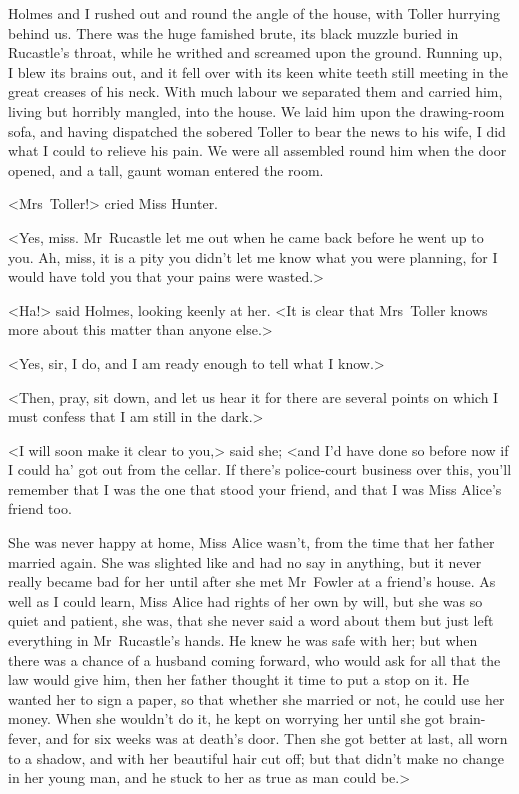 Holmes and I rushed out and round the angle of the house, with Toller hurrying behind us. There was the huge famished brute, its black muzzle buried in Rucastle's throat, while he writhed and screamed upon the ground. Running up, I blew its brains out, and it fell over with its keen white teeth still meeting in the great creases of his neck. With much labour we separated them and carried him, living but horribly mangled, into the house. We laid him upon the drawing-room sofa, and having dispatched the sobered Toller to bear the news to his wife, I did what I could to relieve his pain. We were all assembled round him when the door opened, and a tall, gaunt woman entered the room.

<Mrs~Toller!> cried Miss Hunter.

<Yes, miss. Mr~Rucastle let me out when he came back before he went up to you. Ah, miss, it is a pity you didn't let me know what you were planning, for I would have told you that your pains were wasted.>

<Ha!> said Holmes, looking keenly at her. <It is clear that Mrs~Toller knows more about this matter than anyone else.>

<Yes, sir, I do, and I am ready enough to tell what I know.>

<Then, pray, sit down, and let us hear it for there are several points on which I must confess that I am still in the dark.>

<I will soon make it clear to you,> said she; <and I'd have done so before now if I could ha' got out from the cellar. If there's police-court business over this, you'll remember that I was the one that stood your friend, and that I was Miss Alice's friend too.

She was never happy at home, Miss Alice wasn't, from the time that her father married again. She was slighted like and had no say in anything, but it never really became bad for her until after she met Mr~Fowler at a friend's house. As well as I could learn, Miss Alice had rights of her own by will, but she was so quiet and patient, she was, that she never said a word about them but just left everything in Mr~Rucastle's hands. He knew he was safe with her; but when there was a chance of a husband coming forward, who would ask for all that the law would give him, then her father thought it time to put a stop on it. He wanted her to sign a paper, so that whether she married or not, he could use her money. When she wouldn't do it, he kept on worrying her until she got brain-fever, and for six weeks was at death's door. Then she got better at last, all worn to a shadow, and with her beautiful hair cut off; but that didn't make no change in her young man, and he stuck to her as true as man could be.>

